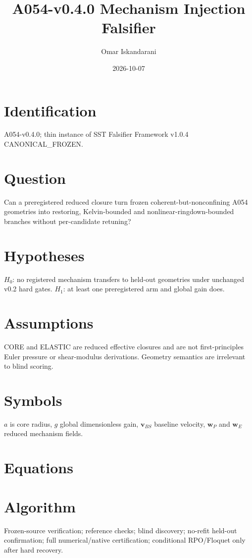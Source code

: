 \documentclass[11pt]{article}
\title{A054-v0.4.0 Mechanism Injection Falsifier}\author{Omar Iskandarani}\date{2026-10-07}
\begin{document}
\maketitle
\section{Identification} A054-v0.4.0; thin instance of SST Falsifier Framework v1.0.4 CANONICAL\_FROZEN.
\section{Question} Can a preregistered reduced closure turn frozen coherent-but-nonconfining A054 geometries into restoring, Kelvin-bounded and nonlinear-ringdown-bounded branches without per-candidate retuning?
\section{Hypotheses} $H_0$: no registered mechanism transfers to held-out geometries under unchanged v0.2 hard gates. $H_1$: at least one preregistered arm and global gain does.
\section{Assumptions} CORE and ELASTIC are reduced effective closures and are not first-principles Euler pressure or shear-modulus derivations. Geometry semantics are irrelevant to blind scoring.
\section{Symbols} $a$ is core radius, $g$ global dimensionless gain, $\mathbf v_{BS}$ baseline velocity, $\mathbf w_P$ and $\mathbf w_E$ reduced mechanism fields.
\section{Equations}
\section{Algorithm} Frozen-source verification; reference checks; blind discovery; no-refit held-out confirmation; full numerical/native certification; conditional RPO/Floquet only after hard recovery.
\end{document}
